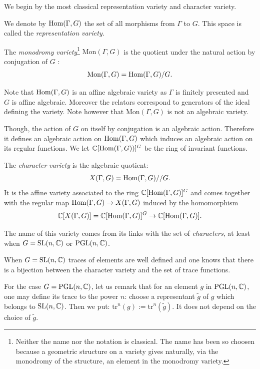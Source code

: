 We begin by the most classical representation variety and character variety.

\newcommand{\Mon}{\mathrm{Mon}}

\begin{defn} 
We denote by $\mathrm{Hom}(\Gamma, G)$ the set of all morphisms
from $\Gamma$ to $G$. This space is called the \emph{representation variety}.

The \emph{monodromy variety}\footnote{Neither the name nor the notation is classical. The name has been so choosen because a geometric structure on a variety gives naturally, via the monodromy of the structure, an element in the monodromy variety.} $\Mon(\Gamma,G)$ is the quotient under the natural action by conjugation of $G$ :
$$\Mon(\Gamma,G)=\Hom(\Gamma,G)/G.$$
\end{defn}

Note that $\mathrm{Hom}(\Gamma,G)$ is an affine algebraic variety as $\Gamma$ is finitely presented and $G$ is affine  algebraic. Moreover the relators correspond to generators of the ideal defining the variety. Note however that $\Mon(\Gamma,G)$ is not an algebraic variety.

Though, the action of $G$ on itself by conjugation is an algebraic action.  Therefore it defines an algebraic action on $\mathrm{Hom}(\Gamma, G)$ which induces an
algebraic action on its regular functions.  We let $\mathbb{C}[\mathrm{Hom}(\Gamma, G))]^{G}$ be the ring of invariant functions.
\begin{defn}
The \emph{character variety} is the algebraic quotient:
$$
X(  \Gamma, G)=\mathrm{Hom}(\Gamma, G)//G.
$$
It is the affine variety associated to the ring  $\mathbb{C}[\mathrm{Hom}(\Gamma, G)]^{G}$ and comes together with the  regular map
$\mathrm{Hom}(\Gamma, G)\rightarrow  X(\Gamma, G)$ induced by the homomorphism 
$$
  \mathbb{C}[X(  \Gamma, G)]=\mathbb{C}[\mathrm{Hom}(\Gamma, G)]^{G} \rightarrow \mathbb{C}[\mathrm{Hom}(\Gamma, G)]. 
$$
\end{defn}
\newcommand{\tr}{\mathrm{tr}}
The name of this variety comes from its links with the set of \emph{characters}, at least when $G=\textrm{SL}(n,\mathbb{C})$ or $\textrm{PGL}(n,\mathbb{C})$. 

When $G=\textrm{SL}(n,\mathbb{C})$ traces of elements are well defined and one knows that there is a bijection between the character variety and the set of trace functions.

For the case $G=\textrm{PGL}(n,\mathbb{C})$, let us remark that for an element $g$ in $\textrm{PGL}(n,\mathbb{C})$, one may define its trace to the power $n$: choose a representant $\tilde g$ of $g$ which belongs to $\textrm{SL}(n,\mathbb{C})$. Then we put: $\tr^n(g):=\tr^n(\tilde g)$. It does not depend on the choice of $\tilde g$.

